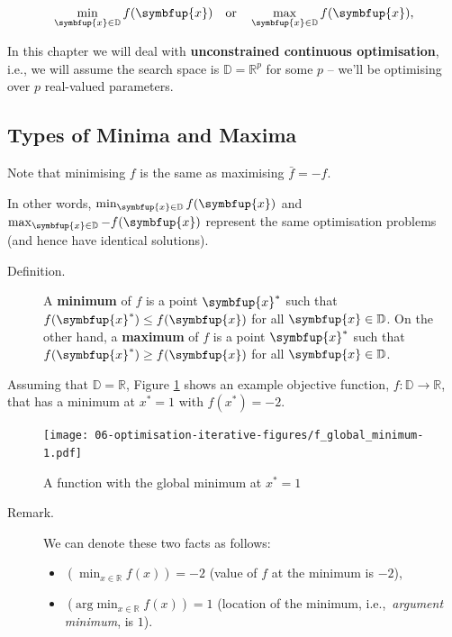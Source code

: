 \documentclass[10pt,b5paper,krantz1]{krantz}
\providecommand{\tightlist}{%
  \setlength{\itemsep}{0pt}\setlength{\parskip}{0pt}}
\renewcommand{\mathbf}[1]{\symbfup{#1}}
\begin{document}
\[
\min_{\mathbf{x}\in \mathbb{D}} f(\mathbf{x})
\quad\text{or}\quad\max_{\mathbf{x}\in \mathbb{D}} f(\mathbf{x}),
\]

In this chapter we will deal with \textbf{unconstrained continuous optimisation},
i.e., we will assume the search space is \(\mathbb{D}=\mathbb{R}^p\) for some \(p\) --
we'll be optimising over \(p\) real-valued parameters.

\hypertarget{types-of-minima-and-maxima}{%
\subsection{Types of Minima and Maxima}\label{types-of-minima-and-maxima}}

Note that minimising \(f\) is the same as maximising \(\bar{f}=-f\).

In other words, \(\min_{\mathbf{x}\in \mathbb{D}} f(\mathbf{x})\)
and \(\max_{\mathbf{x}\in \mathbb{D}} -f(\mathbf{x})\)
represent the same optimisation problems
(and hence have identical solutions).

\begin{description}
\item[Definition.]
A \textbf{minimum} of \(f\) is a point \(\mathbf{x}^*\) such that
\(f(\mathbf{x}^*)\le f(\mathbf{x})\) for all \(\mathbf{x}\in \mathbb{D}\).
On the other hand, a \textbf{maximum} of \(f\) is a point \(\mathbf{x}^*\) such that
\(f(\mathbf{x}^*)\ge f(\mathbf{x})\) for all \(\mathbf{x}\in \mathbb{D}\).
\end{description}

Assuming that \(\mathbb{D}=\mathbb{R}\), Figure \ref{fig:f_global_minimum}
shows an example objective function, \(f:\mathbb{D}\to\mathbb{R}\),
that has a minimum at \({x}^*=1\)
with \(f(x^*)=-2\).

\begin{figure}
\hypertarget{fig:f_global_minimum}{%
\centering
\texttt{[image: 06-optimisation-iterative-figures/f\_global\_minimum-1.pdf]}
\caption{A function with the global minimum at \({x}^*=1\)}\label{fig:f_global_minimum}
}
\end{figure}

\begin{description}
\item[Remark.]
We can denote these two facts as follows:

\begin{itemize}
\tightlist
\item
  \((\min_{x\in \mathbb{R}} f(x))=-2\) (value of \(f\) at the minimum is \(-2\)),
\item
  \((\mathrm{arg}\min_{x\in \mathbb{R}} f(x))=1\) (location of the minimum,
  i.e.,~\emph{argument minimum}, is \(1\)).
\end{itemize}
\end{description}
\end{document}

